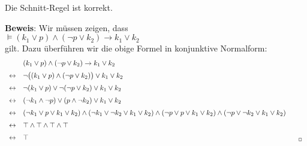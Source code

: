 \begin{Satz}
  Die Schnitt-Regel ist korrekt.
\end{Satz}
\textbf{Beweis}:  Wir m\"{u}ssen zeigen, dass \\[0.2cm]
\hspace*{1.3cm} $\models (k_1 \vee p) \wedge (\neg p \vee k_2) \rightarrow k_1 \vee k_2$ \\[0.2cm]
gilt.  Dazu \"{u}berf\"{u}hren wir die obige Formel in konjunktive Normalform:
$$
\begin{array}{ll}
  & (k_1 \vee p) \wedge (\neg p \vee k_2) \rightarrow k_1 \vee k_2  \\[0.2cm]
\leftrightarrow  & 
    \neg \bigl( (k_1 \vee p) \wedge (\neg p \vee k_2) \bigr) \vee k_1 \vee k_2 \\[0.2cm]
\leftrightarrow  & 
    \neg (k_1 \vee p) \vee \neg (\neg p \vee k_2) \vee k_1 \vee k_2 \\[0.2cm]
\leftrightarrow  & 
     (\neg k_1 \wedge \neg p) \vee  (p \wedge \neg k_2) \vee k_1 \vee k_2 \\[0.2cm]
\leftrightarrow  & 
     (\neg k_1 \vee p \vee k_1 \vee k_2)  \wedge 
     (\neg k_1 \vee \neg k_2 \vee k_1 \vee k_2)  \wedge 
     (\neg p \vee p \vee k_1 \vee k_2)  \wedge 
     (\neg p \vee \neg k_2 \vee k_1 \vee k_2) 
      \\[0.2cm]
\leftrightarrow  & 
     \verum  \wedge 
     \verum  \wedge 
     \verum  \wedge 
     \verum 
      \\[0.2cm]
\leftrightarrow  & 
     \verum    \hspace*{13.5cm} _\Box
      \\
\end{array}
$$



